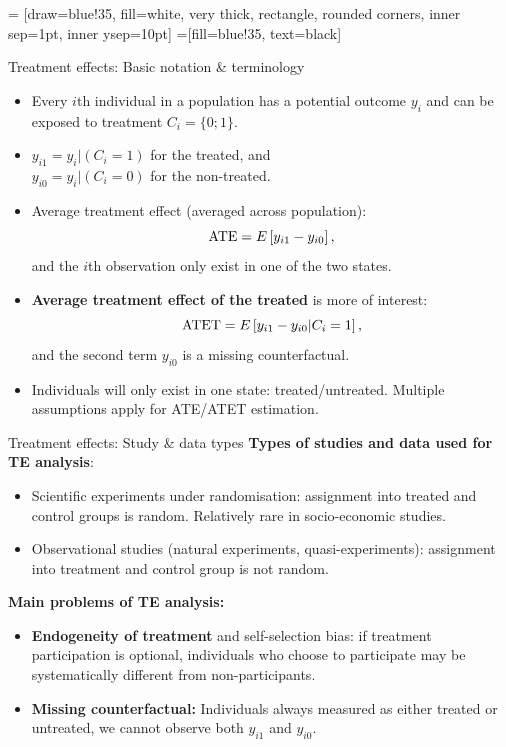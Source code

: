 \documentclass{beamer}
\begin{document}
 = [draw=blue!35, fill=white, very thick,
    rectangle, rounded corners, inner sep=1pt, inner ysep=10pt]
 =[fill=blue!35, text=black]
\begin{frame}{Treatment effects: Basic notation \& terminology}
\begin{itemize}
    \item Every $i$th individual in a population has a potential outcome $y_i$ and can be exposed to treatment $C_i=\{0;1\}$. 
    \medskip
    \item $y_{i1} = y_i | (C_i = 1) $ for the treated, and \\
    $y_{i0} = y_i | (C_i = 0)$ for the non-treated.
    \medskip
    \item Average treatment effect (averaged across population):
    $$\textnormal{ATE} = E \left[ y_{i1}-y_{i0}\right],$$
    and the $i$th observation only exist in one of the two states.
    \medskip
    \item \textbf{Average treatment effect of the treated} is more of interest:
    $$\textnormal{ATET} = E \left[ y_{i1}-y_{i0} | C_i = 1\right],$$
    and the second term $y_{i0}$ is a missing counterfactual. 
    \medskip
    \item Individuals will only exist in one state: treated/untreated. Multiple assumptions apply for ATE/ATET estimation.
\end{itemize}  
\end{frame}
\begin{frame}{Treatment effects: Study \& data types}
\textbf{Types of studies and data used for TE analysis}:\\
\begin{itemize}
    \item Scientific experiments under randomisation: assignment into treated and control groups is random. Relatively rare in socio-economic studies. 
    \medskip
    \item Observational studies (natural experiments, quasi-experiments): assignment into treatment and control group is not random. \\ \medskip
\end{itemize}
\bigskip
\textbf{Main problems of TE analysis:}
\begin{itemize}
    \item \textbf{Endogeneity of treatment} and self-selection bias: if treatment participation is optional, individuals who choose to participate may be systematically different from non-participants.
    \medskip
    \item \textbf{Missing counterfactual:}  Individuals always measured as either treated or untreated, we cannot observe both $y_{i1}$ and $y_{i0}$.
\end{itemize}
    

\end{frame}
\end{document}
